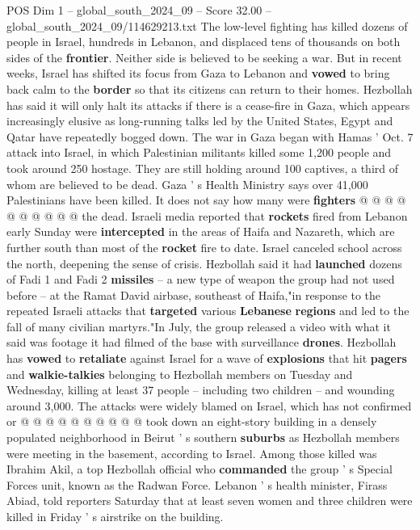 \begin{textsample}{POS Dim 1 – global\_south\_2024\_09 – Score 32.00 – global\_south\_2024\_09/114629213.txt}
The low-level fighting has killed dozens of people in Israel, hundreds in Lebanon, and displaced tens of thousands on both sides of the \textbf{frontier}.
Neither side is believed to be seeking a war.
But in recent weeks, Israel has shifted its focus from Gaza to Lebanon and \textbf{vowed} to bring back calm to the \textbf{border} so that its citizens can return to their homes.
Hezbollah has said it will only halt its attacks if there is a cease-fire in Gaza, which appears increasingly elusive as long-running talks led by the United States, Egypt and Qatar have repeatedly bogged down.
The war in Gaza began with Hamas ' Oct. 7 attack into Israel, in which Palestinian militants killed some 1,200 people and took around 250 hostage.
They are still holding around 100 captives, a third of whom are believed to be dead.
Gaza ' s Health Ministry says over 41,000 Palestinians have been killed.
It does not say how many were \textbf{fighters} @ @ @ @ @ @ @ @ @ @ the dead.
Israeli media reported that \textbf{rockets} fired from Lebanon early Sunday were \textbf{intercepted} in the areas of Haifa and Nazareth, which are further south than most of the \textbf{rocket} fire to date.
Israel canceled school across the north, deepening the sense of crisis.
Hezbollah said it had \textbf{launched} dozens of Fadi 1 and Fadi 2 \textbf{missiles} -- a new type of weapon the group had not used before -- at the Ramat David airbase, southeast of Haifa,"in response to the repeated Israeli attacks that \textbf{targeted} various \textbf{Lebanese} \textbf{regions} and led to the fall of many civilian martyrs."In July, the group released a video with what it said was footage it had filmed of the base with surveillance \textbf{drones}.
Hezbollah has \textbf{vowed} to \textbf{retaliate} against Israel for a wave of \textbf{explosions} that hit \textbf{pagers} and \textbf{walkie-talkies} belonging to Hezbollah members on Tuesday and Wednesday, killing at least 37 people -- including two children -- and wounding around 3,000.
The attacks were widely blamed on Israel, which has not confirmed or @ @ @ @ @ @ @ @ @ @ took down an eight-story building in a densely populated neighborhood in Beirut ' s southern \textbf{suburbs} as Hezbollah members were meeting in the basement, according to Israel.
Among those killed was Ibrahim Akil, a top Hezbollah official who \textbf{commanded} the group ' s Special Forces unit, known as the Radwan Force.
Lebanon ' s health minister, Firass Abiad, told reporters Saturday that at least seven women and three children were killed in Friday ' s airstrike on the building.

\end{textsample}
